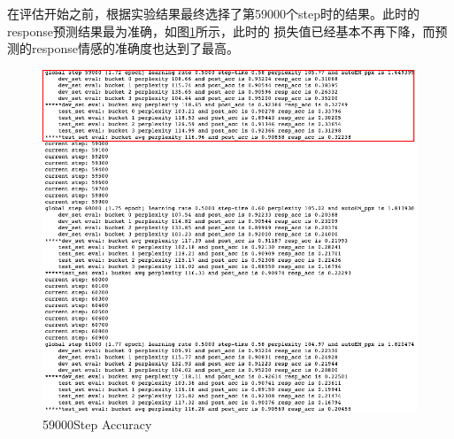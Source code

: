 \documentclass[supercite]{HustGraduPaper}
\theoremstyle{definition}
\begin{document}
在评估开始之前，根据实验结果最终选择了第59000个step时的结果。此时的response预测结果最为准确，如图\ref{Fig.59000}所示，此时的
损失值已经基本不再下降，而预测的response情感的准确度也达到了最高。

\begin{figure}[H] %
  \centering %
  \includegraphics[width=1\textwidth]{images/59000.png} %
  \caption{59000Step Accuracy} %
  \label{Fig.59000} %
\end{figure}
\end{document}
